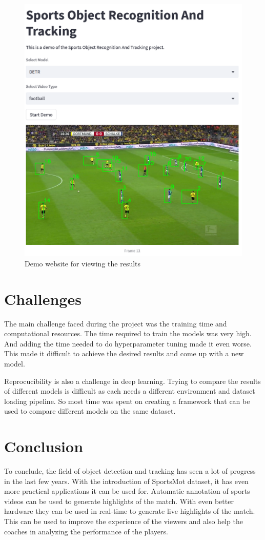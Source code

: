 \documentclass[runningheads]{llncs}
\begin{document}
\begin{figure}
    \centering
    \includegraphics[width=\textwidth,height=13cm,keepaspectratio]{images/sport_demo.png}
    \caption{Demo website for viewing the results}
    \label{fig:sport_demo}
\end{figure}


\section{Challenges}

The main challenge faced during the project was the training time and computational resources.
The time required to train the models was very high.
And adding the time needed to do hyperparameter tuning made it even worse.
This made it difficult to achieve the desired results and come up with a new model.

Reprocucibility is also a challenge in deep learning.
Trying to compare the results of different models is difficult as each needs a different environment and dataset loading pipeline.
So most time was spent on creating a framework that can be used to compare different models on the same dataset.

\section{Conclusion}
To conclude, the field of object detection and tracking has seen a lot of progress in the last few years.
With the introduction of SportsMot dataset, it has even more practical applications it can be used for.
Automatic annotation of sports videos can be used to generate highlights of the match.
With even better hardware they can be used in real-time to generate live highlights of the match.
This can be used to improve the experience of the viewers and also help the coaches in analyzing the performance of the players.
\end{document}
